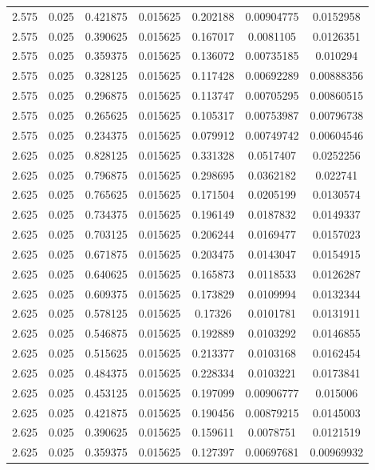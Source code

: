 \begin{flushleft}
\begin{longtable}{ccccccc}
2.575 & 0.025 & 0.421875 & 0.015625 & 0.202188 & 0.00904775 & 0.0152958  \\ 
2.575 & 0.025 & 0.390625 & 0.015625 & 0.167017 & 0.0081105 & 0.0126351  \\ 
2.575 & 0.025 & 0.359375 & 0.015625 & 0.136072 & 0.00735185 & 0.010294  \\ 
2.575 & 0.025 & 0.328125 & 0.015625 & 0.117428 & 0.00692289 & 0.00888356  \\ 
2.575 & 0.025 & 0.296875 & 0.015625 & 0.113747 & 0.00705295 & 0.00860515  \\ 
2.575 & 0.025 & 0.265625 & 0.015625 & 0.105317 & 0.00753987 & 0.00796738  \\ 
2.575 & 0.025 & 0.234375 & 0.015625 & 0.079912 & 0.00749742 & 0.00604546  \\ 
2.625 & 0.025 & 0.828125 & 0.015625 & 0.331328 & 0.0517407 & 0.0252256  \\ 
2.625 & 0.025 & 0.796875 & 0.015625 & 0.298695 & 0.0362182 & 0.022741  \\ 
2.625 & 0.025 & 0.765625 & 0.015625 & 0.171504 & 0.0205199 & 0.0130574  \\ 
2.625 & 0.025 & 0.734375 & 0.015625 & 0.196149 & 0.0187832 & 0.0149337  \\ 
2.625 & 0.025 & 0.703125 & 0.015625 & 0.206244 & 0.0169477 & 0.0157023  \\ 
2.625 & 0.025 & 0.671875 & 0.015625 & 0.203475 & 0.0143047 & 0.0154915  \\ 
2.625 & 0.025 & 0.640625 & 0.015625 & 0.165873 & 0.0118533 & 0.0126287  \\ 
2.625 & 0.025 & 0.609375 & 0.015625 & 0.173829 & 0.0109994 & 0.0132344  \\ 
2.625 & 0.025 & 0.578125 & 0.015625 & 0.17326 & 0.0101781 & 0.0131911  \\ 
2.625 & 0.025 & 0.546875 & 0.015625 & 0.192889 & 0.0103292 & 0.0146855  \\ 
2.625 & 0.025 & 0.515625 & 0.015625 & 0.213377 & 0.0103168 & 0.0162454  \\ 
2.625 & 0.025 & 0.484375 & 0.015625 & 0.228334 & 0.0103221 & 0.0173841  \\ 
2.625 & 0.025 & 0.453125 & 0.015625 & 0.197099 & 0.00906777 & 0.015006  \\ 
2.625 & 0.025 & 0.421875 & 0.015625 & 0.190456 & 0.00879215 & 0.0145003  \\ 
2.625 & 0.025 & 0.390625 & 0.015625 & 0.159611 & 0.0078751 & 0.0121519  \\ 
2.625 & 0.025 & 0.359375 & 0.015625 & 0.127397 & 0.00697681 & 0.00969932  \\ 

\end{longtable}
\end{flushleft}
